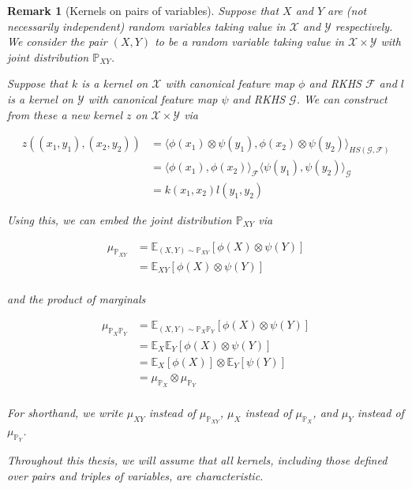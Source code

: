 \documentclass[12pt]{article}
\newtheorem*{remark}{Remark}
\numberwithin{claim}{section}
\numberwithin{lemma}{section}
\numberwithin{theorem}{section}
\begin{document}
\begin{remark}[Kernels on pairs of variables]
Suppose that $X$ and $Y$ are (not necessarily independent) random variables taking value in $\mathcal{X}$ and $\mathcal{Y}$ respectively. We consider the pair $(X,Y)$ to be a random variable taking value in $\mathcal{X} \times \mathcal{Y}$ with joint distribution $\mathbb{P}_{XY}$.

Suppose that $k$ is a kernel on $\mathcal{X}$ with canonical feature map $\phi$ and RKHS $\mathcal{F}$ and $l$ is a kernel on $\mathcal{Y}$ with canonical feature map $\psi$ and RKHS $\mathcal{G}$. We can construct from these a new kernel $z$ on $\mathcal{X} \times \mathcal{Y}$ via

\begin{align*}
z((x_1,y_1),(x_2,y_2)) &= \langle \phi(x_1)\otimes\psi(y_1) ,\phi(x_2)\otimes\psi(y_2)\rangle_{HS(\mathcal{G},\mathcal{F})}  \\
& = \langle \phi(x_1) ,\phi(x_2)\rangle_{\mathcal{F}} \langle \psi(y_1) ,\psi(y_2)\rangle_{\mathcal{G}}\\
& = k(x_1,x_2) l(y_1,y_2)
\end{align*}

Using this, we can embed the joint distribution $\mathbb{P}_{XY}$ via

\begin{align*}
\mu_{\mathbb{P}_{XY}}  &= \mathbb{E}_{(X,Y)\sim \mathbb{P}_{XY}}[ \phi(X)\otimes\psi(Y)]\\
&= \mathbb{E}_{XY}[ \phi(X)\otimes\psi(Y)]\\
\end{align*}

and the product of marginals

\begin{align*}
\mu_{\mathbb{P}_{X}\mathbb{P}_{Y}} &= \mathbb{E}_{(X,Y)\sim \mathbb{P}_{X}\mathbb{P}_{Y}}[ \phi(X)\otimes\psi(Y)] \\
&= \mathbb{E}_{X}\mathbb{E}_{Y}[ \phi(X)\otimes\psi(Y)]\\
&= \mathbb{E}_{X}[\phi(X)]\otimes\mathbb{E}_{Y}[ \psi(Y)]\\
&= \mu_{\mathbb{P}_{X}}\otimes \mu_{\mathbb{P}_{Y}} \\
\end{align*}

For shorthand, we write $\mu_{XY}$ instead of $\mu_{\mathbb{P}_{XY}}$, $\mu_{X}$ instead of $\mu_{\mathbb{P}_{X}}$, and $\mu_{Y}$ instead of $\mu_{\mathbb{P}_{Y}}$.

Throughout this thesis, we will assume that all kernels, including those defined over pairs and triples of variables, are characteristic.

\end{remark}
\end{document}
